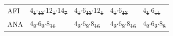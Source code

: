 \documentclass[preprint,numrefs,noinfo,sort&compress]{elsarticle}
\providecommand{\DIFadd}[1]{{\protect\color{blue}\uwave{#1}}} %
\providecommand{\DIFdel}[1]{{\protect\color{red}\sout{#1}}}                      %
\providecommand{\DIFaddFL}[1]{\DIFadd{#1}} %
\providecommand{\DIFdelFL}[1]{\DIFdel{#1}} %
\providecommand{\DIFaddbeginFL}{} %
\providecommand{\DIFaddendFL}{} %
\providecommand{\DIFdelbeginFL}{} %
\providecommand{\DIFdelendFL}{} %
\newcommand{\DIFscaledelfig}{0.5}
\newlength{\DIFdelgraphicswidth} %
\newlength{\DIFdelgraphicsheight} %
\newcommand{\DIFaddincludegraphics}[2][]{{\color{blue}\fbox{\DIFOincludegraphics[#1]{#2}}}} %
\newcommand{\DIFdelincludegraphics}[2][]{%
\sbox{\DIFdelgraphicsbox}{\DIFOincludegraphics[#1]{#2}}%
\settoboxwidth{\DIFdelgraphicswidth}{\DIFdelgraphicsbox} %
\settoboxtotalheight{\DIFdelgraphicsheight}{\DIFdelgraphicsbox} %
\scalebox{\DIFscaledelfig}{%
\parbox[b]{\DIFdelgraphicswidth}{\usebox{\DIFdelgraphicsbox}\\[-\baselineskip] \rule{\DIFdelgraphicswidth}{0em}}\llap{\resizebox{\DIFdelgraphicswidth}{\DIFdelgraphicsheight}{%
\setlength{\unitlength}{\DIFdelgraphicswidth}%
\begin{picture}(1,1)%
\thicklines\linethickness{2pt} %
{\color[rgb]{1,0,0}\put(0,0){\framebox(1,1){}}}%
{\color[rgb]{1,0,0}\put(0,0){\line( 1,1){1}}}%
{\color[rgb]{1,0,0}\put(0,1){\line(1,-1){1}}}%
\end{picture}%
}\hspace*{3pt}}} %
} %
\DeclareRobustCommand{\DIFaddbeginFL}{\DIFOaddbeginFL \let\includegraphics\DIFaddincludegraphics} %
\DeclareRobustCommand{\DIFaddendFL}{\DIFOaddendFL \let\includegraphics\DIFOincludegraphics} %
\DeclareRobustCommand{\DIFdelbeginFL}{\DIFOdelbeginFL \let\includegraphics\DIFdelincludegraphics} %
\DeclareRobustCommand{\DIFdelendFL}{\DIFOaddendFL \let\includegraphics\DIFOincludegraphics} %
\begin{document}
\begin{table}
\begin{threeparttable}
{\begin{tabular}{lllll}
AFI & 4\DIFdelbeginFL \DIFdelFL{\textsubscript{1}\(\cdot\)\textsubscript{13}\(\cdot\)}\DIFdelendFL \DIFaddbeginFL \DIFaddFL{\(_{\text{1}} \cdot\)\(_{\text{13}} \cdot\)}\DIFaddendFL 12\DIFdelbeginFL \DIFdelFL{\textsubscript{1}\(\cdot\)}\DIFdelendFL \DIFaddbeginFL \DIFaddFL{\(_{\text{1}} \cdot\)}\DIFaddendFL 14\DIFdelbeginFL \DIFdelFL{\textsubscript{7} }\DIFdelendFL \DIFaddbeginFL \DIFaddFL{\(_{\text{7}}\) }\DIFaddendFL & 4\DIFdelbeginFL \DIFdelFL{\textsubscript{1}\(\cdot\)}\DIFdelendFL \DIFaddbeginFL \DIFaddFL{\(_{\text{1}} \cdot\)}\DIFaddendFL 6\DIFdelbeginFL \DIFdelFL{\textsubscript{13}\(\cdot\)}\DIFdelendFL \DIFaddbeginFL \DIFaddFL{\(_{\text{13}} \cdot\)}\DIFaddendFL 12\DIFdelbeginFL \DIFdelFL{\textsubscript{1} }\DIFdelendFL \DIFaddbeginFL \DIFaddFL{\(_{\text{1}}\) }\DIFaddendFL & 4\DIFdelbeginFL \DIFdelFL{\textsubscript{1}\(\cdot\)}\DIFdelendFL \DIFaddbeginFL \DIFaddFL{\(_{\text{1}} \cdot\)}\DIFaddendFL 6\DIFdelbeginFL \DIFdelFL{\textsubscript{13} }\DIFdelendFL \DIFaddbeginFL \DIFaddFL{\(_{\text{13}}\) }\DIFaddendFL & 4\DIFdelbeginFL \DIFdelFL{\textsubscript{1}\(\cdot\)}\DIFdelendFL \DIFaddbeginFL \DIFaddFL{\(_{\text{1}} \cdot\)}\DIFaddendFL 6\DIFdelbeginFL \DIFdelFL{\textsubscript{11}}\DIFdelendFL \DIFaddbeginFL \DIFaddFL{\(_{\text{11}}\)}\DIFaddendFL \\
ANA & 4\DIFdelbeginFL \DIFdelFL{\textsubscript{2}\(\cdot\)}\DIFdelendFL \DIFaddbeginFL \DIFaddFL{\(_{\text{2}} \cdot\)}\DIFaddendFL 6\DIFdelbeginFL \DIFdelFL{\textsubscript{2}\(\cdot\)}\DIFdelendFL \DIFaddbeginFL \DIFaddFL{\(_{\text{2}} \cdot\)}\DIFaddendFL 8\DIFdelbeginFL \DIFdelFL{\textsubscript{16} }\DIFdelendFL \DIFaddbeginFL \DIFaddFL{\(_{\text{16}}\) }\DIFaddendFL & 4\DIFdelbeginFL \DIFdelFL{\textsubscript{2}\(\cdot\)}\DIFdelendFL \DIFaddbeginFL \DIFaddFL{\(_{\text{2}} \cdot\)}\DIFaddendFL 6\DIFdelbeginFL \DIFdelFL{\textsubscript{2}\(\cdot\)}\DIFdelendFL \DIFaddbeginFL \DIFaddFL{\(_{\text{2}} \cdot\)}\DIFaddendFL 8\DIFdelbeginFL \DIFdelFL{\textsubscript{16} }\DIFdelendFL \DIFaddbeginFL \DIFaddFL{\(_{\text{16}}\) }\DIFaddendFL & 4\DIFdelbeginFL \DIFdelFL{\textsubscript{2}\(\cdot\)}\DIFdelendFL \DIFaddbeginFL \DIFaddFL{\(_{\text{2}} \cdot\)}\DIFaddendFL 6\DIFdelbeginFL \DIFdelFL{\textsubscript{2}\(\cdot\)}\DIFdelendFL \DIFaddbeginFL \DIFaddFL{\(_{\text{2}} \cdot\)}\DIFaddendFL 8\DIFdelbeginFL \DIFdelFL{\textsubscript{16} }\DIFdelendFL \DIFaddbeginFL \DIFaddFL{\(_{\text{16}}\) }\DIFaddendFL & 4\DIFdelbeginFL \DIFdelFL{\textsubscript{2}\(\cdot\)}\DIFdelendFL \DIFaddbeginFL \DIFaddFL{\(_{\text{2}} \cdot\)}\DIFaddendFL 6\DIFdelbeginFL \DIFdelFL{\textsubscript{2}\(\cdot\)}\DIFdelendFL \DIFaddbeginFL \DIFaddFL{\(_{\text{2}} \cdot\)}\DIFaddendFL 8\DIFdelbeginFL \DIFdelFL{\textsubscript{8}}\DIFdelendFL \DIFaddbeginFL \DIFaddFL{\(_{\text{8}}\)}\DIFaddendFL \\

\end{tabular}}
\end{threeparttable}
\end{table}
\end{document}

